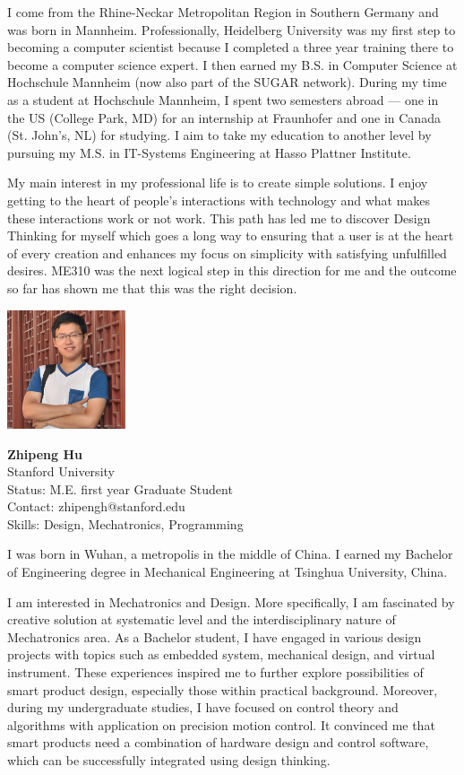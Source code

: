 I come from the Rhine-Neckar Metropolitan Region in Southern Germany and was born in Mannheim. Professionally, Heidelberg University was my first step to becoming a computer scientist because I completed a three year training there to become a computer science expert. I then earned my B.S. in Computer Science at Hochschule Mannheim (now also part of the SUGAR network). During my time as a student at Hochschule Mannheim, I spent two semesters abroad --- one in the US (College Park, MD) for an internship at Fraunhofer and one in Canada (St. John's, NL) for studying. I aim to take my education to another level by pursuing my M.S. in IT-Systems Engineering at Hasso Plattner Institute.

My main interest in my professional life is to create simple solutions. I enjoy getting to the heart of people's interactions with technology and what makes these interactions work or not work. This path has led me to discover Design Thinking for myself which goes a long way to ensuring that a user is at the heart of every creation and enhances my focus on simplicity with satisfying unfulfilled desires. ME310  was the next logical step in this direction for me and the outcome so far has shown me that this was the right decision.

\vspace{2em}
\noindent \includegraphics[width=35mm]{Figures/People/Zhipeng}
\hspace{0.5em}\parbox[b]{0.6\textwidth}{\textbf{Zhipeng Hu}\\
Stanford University\\
Status: M.E. first year Graduate Student\\
Contact: zhipengh@stanford.edu\\
Skills: Design, Mechatronics, Programming\\
}

I was born in Wuhan, a metropolis in the middle of China. I earned my Bachelor of Engineering degree in Mechanical Engineering at Tsinghua University, China.

I am interested in Mechatronics and Design. More specifically, I am fascinated by creative solution at systematic level and the interdisciplinary nature of Mechatronics area. As a Bachelor student, I have engaged in various design projects with topics such as embedded system, mechanical design, and virtual instrument. These experiences inspired me to further explore possibilities of smart product design, especially those within practical background. Moreover, during my undergraduate studies, I have focused on control theory and algorithms with application on precision motion control. It convinced me that smart products need a combination of hardware design and control software, which can be successfully integrated using design thinking.

